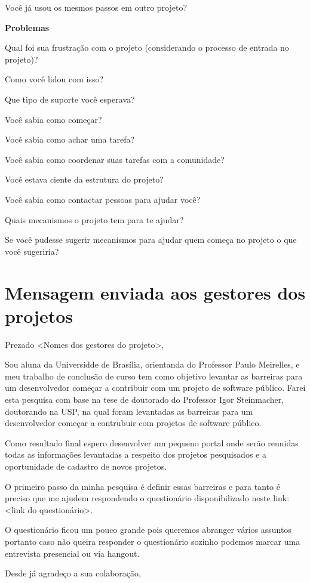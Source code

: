 \begin{anexosenv}
Você já usou os mesmos passos em outro projeto?

\textbf{Problemas}


Qual foi sua frustração com o projeto (considerando o processo de entrada no projeto)?

Como você lidou com isso?

Que tipo de suporte você esperava?

Você sabia como começar?

Você sabia como achar uma tarefa?

Você sabia como coordenar suas tarefas com a comunidade?

Você estava ciente da estrutura do projeto?

Você sabia como contactar pessoas para ajudar você?

Quais mecanismos o projeto tem para te ajudar?

Se você pudesse sugerir mecanismos para ajudar quem começa no projeto o que você sugeriria?


\chapter{Mensagem enviada aos gestores dos projetos}
\label{anexo d}

Prezado <Nomes dos gestores do projeto>,

Sou aluna da Universidde de Brasília, orientanda do Professor Paulo Meirelles, 
e meu trabalho de conclusão de curso tem como objetivo levantar as barreiras para 
um desenvolvedor começar a contribuir com um projeto de software público. Farei 
esta pesquisa com base na tese de doutorado do Professor Igor Steinmacher, 
doutorando na USP, na qual foram levantadas as barreiras para um desenvolvedor 
começar a contrubuir com projetos de software público.

Como resultado final espero desenvolver um pequeno portal onde serão 
reunidas todas as informações levantadas a respeito dos projetos pesquisados e a 
oportunidade de cadastro de novos projetos.

O primeiro passo da minha pesquisa é definir essas barreiras e para tanto é
preciso que me ajudem respondendo o questionário disponibilizado neste link:
<link do questionário>.

O questionário ficou um pouco grande pois queremos abranger vários assuntos 
portanto caso não queira responder o questionário sozinho podemos marcar uma 
entrevista presencial ou via hangout.

Desde já agradeço a sua colaboração,



\end{anexosenv}
